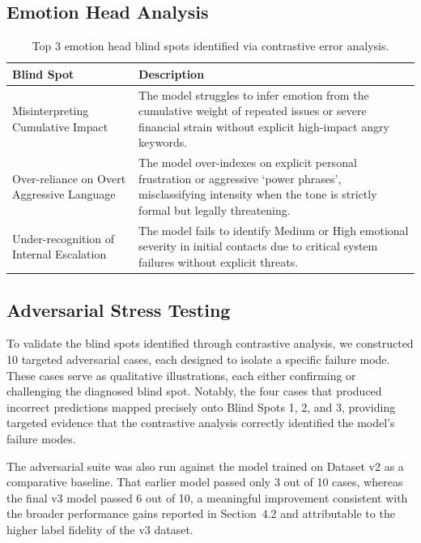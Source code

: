 \documentclass[11pt]{article}
\begin{document}
\subsection{Emotion Head Analysis}

\begin{table}[H]
  \centering
  \small
  \begin{tabular}{p{3.8cm}p{9cm}}
    \toprule
    \textbf{Blind Spot} & \textbf{Description} \\
    \midrule
    Misinterpreting Cumulative Impact &
      The model struggles to infer emotion from the cumulative weight of repeated issues
      or severe financial strain without explicit high-impact angry keywords. \\
    \addlinespace
    Over-reliance on Overt Aggressive Language &
      The model over-indexes on explicit personal frustration or aggressive `power
      phrases', misclassifying intensity when the tone is strictly formal but legally
      threatening. \\
    \addlinespace
    Under-recognition of Internal Escalation &
      The model fails to identify Medium or High emotional severity in initial contacts
      due to critical system failures without explicit threats. \\
    \bottomrule
  \end{tabular}
  \caption{Top 3 emotion head blind spots identified via contrastive error analysis.}
  \label{tab:emotion_blindspots}
\end{table}

\subsection{Adversarial Stress Testing}

To validate the blind spots identified through contrastive analysis, we constructed 10
targeted adversarial cases, each designed to isolate a specific failure mode. These
cases serve as qualitative illustrations, each either confirming or challenging the
diagnosed blind spot. Notably, the four cases that produced incorrect predictions
mapped precisely onto Blind Spots 1, 2, and 3, providing targeted evidence that the
contrastive analysis correctly identified the model's failure modes.

The adversarial suite was also run against the model trained on Dataset v2 as a
comparative baseline. That earlier model passed only 3 out of 10 cases, whereas the
final v3 model passed 6 out of 10, a meaningful improvement consistent with the broader
performance gains reported in Section~4.2 and attributable to the higher label fidelity
of the v3 dataset.
\end{document}
